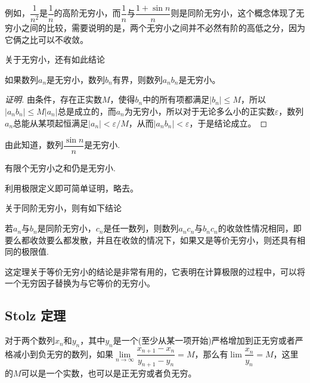 例如，$\dfrac{1}{n^2}$是$\dfrac{1}{n}$的高阶无穷小，而$\dfrac{1}{n}$与$\dfrac{1+\sin{n}}{n}$则是同阶无穷小，这个概念体现了无穷小之间的比较，需要说明的是，两个无穷小之间并不必然有阶的高低之分，因为它俩之比可以不收敛。


关于无穷小，还有如此结论
\begin{theorem}
  如果数列$a_n$是无穷小，数列$b_n$有界，则数列$a_nb_n$是无穷小。
\end{theorem}

\begin{proof}[证明]
  由条件，存在正实数$M$，使得$b_n$中的所有项都满足$|b_n|\leqslant M$，所以$|a_nb_n| \leqslant M |a_n|$总是成立的，而$a_n$为无穷小，所以对于无论多么小的正实数$\varepsilon$，数列$a_n$总能从某项起恒满足$|a_n|<\varepsilon/M$，从而$|a_nb_n|<\varepsilon$，于是结论成立。
\end{proof}

由此知道，数列$\dfrac{\sin{n}}{n}$是无穷小.

\begin{theorem}
  有限个无穷小之和仍是无穷小.
\end{theorem}

利用极限定义即可简单证明，略去。

关于同阶无穷小，则有如下结论
\begin{theorem}
  若$a_n$与$b_n$是同阶无穷小，$c_n$是任一数列，则数列$a_nc_n$与$b_nc_n$的收敛性情况相同，即要么都收敛要么都发散，并且在收敛的情况下，如果又是等价无穷小，则还具有相同的极限值.
\end{theorem}

这定理关于等价无穷小的结论是非常有用的，它表明在计算极限的过程中，可以将一个无穷因子替换为与它等价的无穷小。

\subsection{Stolz 定理}
\label{sec:stolz-theorem}

\begin{theorem}[Stolz 定理]
  对于两个数列$x_n$和$y_n$，其中$y_n$是一个(至少从某一项开始)严格增加到正无穷或者严格减小到负无穷的数列，如果$\lim\limits_{n\to\infty}\dfrac{x_{n+1}-x_n}{y_{n+1}-y_n} = M$，那么有$\lim\limits \dfrac{x_n}{y_n} = M$，这里的$M$可以是一个实数，也可以是正无穷或者负无穷。
\end{theorem}

